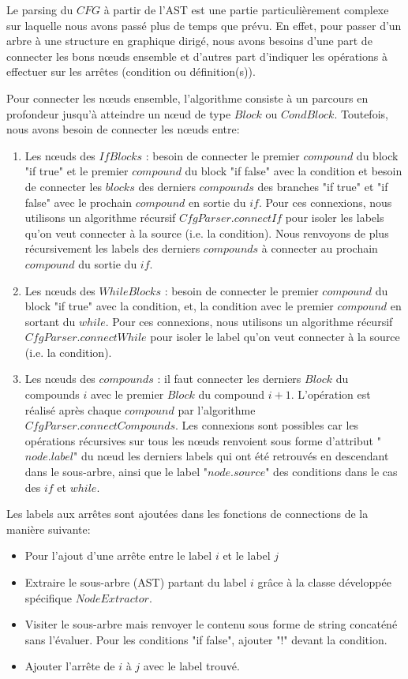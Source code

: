 \documentclass[a4paper]{article}
\begin{document}
Le parsing du $CFG$ à partir de l'AST est une partie particulièrement complexe sur laquelle nous avons passé plus de temps que prévu. En effet, pour passer d'un arbre à une structure en graphique dirigé, nous avons besoins d'une part de connecter les bons nœuds ensemble et d'autres part d'indiquer les opérations à effectuer sur les arrêtes (condition ou définition(s)). 

Pour connecter les nœuds ensemble, l’algorithme consiste à un parcours en profondeur jusqu'à atteindre un nœud de type $Block$ ou $CondBlock$. Toutefois, nous avons besoin de connecter les nœuds entre:
\begin{enumerate}
\item Les nœuds des $IfBlocks$ : besoin de connecter le premier $compound$ du block "if true" et le premier $compound$ du block "if false" avec la condition et besoin de connecter les $blocks$ des derniers $compounds$ des branches "if true" et "if false" avec le prochain $compound$ en sortie du $if$. Pour ces connexions, nous utilisons un algorithme récursif $CfgParser.connectIf$ pour isoler les labels qu'on veut connecter à la source (i.e. la condition). Nous renvoyons de plus récursivement les labels des derniers $compounds$ à connecter au prochain $compound$ du sortie du $if$. 
\item Les nœuds des $WhileBlocks$ : besoin de connecter le premier $compound$ du block "if true" avec la condition, et, la condition avec le premier $compound$ en sortant du $while$. Pour ces connexions, nous utilisons un algorithme récursif $CfgParser.connectWhile$ pour isoler le label qu'on veut connecter à la source (i.e. la condition). 
\item Les nœuds des $compounds$ : il faut connecter les derniers $Block$ du compounds $i$ avec le premier $Block$ du compound $i+1$. L'opération est réalisé après chaque $compound$ par l'algorithme $CfgParser.connectCompounds$. Les connexions sont possibles car les opérations récursives sur tous les nœuds renvoient sous forme d'attribut "$node.label$" du nœud les derniers labels qui ont été retrouvés en descendant dans le sous-arbre, ainsi que le label "$node.source$" des conditions dans le cas des $if$ et $while$. 
\end{enumerate}

Les labels aux arrêtes sont ajoutées dans les fonctions de connections de la manière suivante:
\begin{itemize}
\item Pour l'ajout d'une arrête entre le label $i$ et le label $j$ 
\item Extraire le sous-arbre (AST) partant du label $i$ grâce à la classe développée spécifique $NodeExtractor$. 
\item Visiter le sous-arbre mais renvoyer le contenu sous forme de string concaténé sans l'évaluer. Pour les conditions "if false", ajouter "!" devant la condition. 
\item Ajouter l'arrête de $i$ à $j$ avec le label trouvé. 
\end{itemize}
\end{document}
